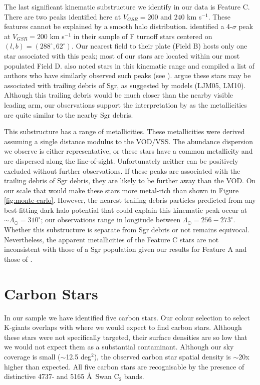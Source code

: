 	The last significant kinematic substructure we identify in our data is Feature C. There are two peaks identified here at $V_{GSR} = 200$ and $240$ km s$^{-1}$. These features cannot be explained by a smooth halo distribution. \citet{Newberg;et-al_2007} identified a 4-$\sigma$ peak at $V_{GSR} = 200$ km s$^{-1}$ in their sample of F turnoff stars centered on $(l, b) = (288^\circ, 62^\circ)$. Our nearest field to their plate (Field B) hosts only one star associated with this peak; most of our stars are located within our most populated Field D. \citet{Prior;et-al_2009b} also noted stars in this kinematic range and compiled a list of authors who have similarly observed such peaks (see \citet{Sirko;et-al_2004, Duffau;et-al_2006, Starkenburg;et-al_2009}). \citet{Prior;et-al_2009b} argue these stars may be associated with trailing debris of Sgr, as suggested by models (LJM05, LM10).  Although this trailing debris would be much closer than the nearby visible leading arm, our observations support the interpretation by \citet{Prior;et-al_2009b} as the metallicities are quite similar to the nearby Sgr debris.
	
	This substructure has a range of metallicities. These metallicities were derived assuming a single distance modulus to the VOD/VSS. The abundance dispersion we observe is either representative, or these stars have a common metallicity and are dispersed along the line-of-sight. Unfortunately neither can be positively excluded without further observations. If these peaks are associated with the trailing debris of Sgr debris, they are likely to be further away than the VOD. On our scale that would make these stars more metal-rich than shown in Figure \ref{fig:monte-carlo}. However, the nearest trailing debris particles predicted from any best-fitting dark halo potential that could explain this kinematic peak occur at $\sim\Lambda_\odot = 310^\circ$; our observations range in longitude  between $\Lambda_\odot = 256-273^\circ$. Whether this substructure is separate from Sgr debris or not remains equivocal. Nevertheless, the apparent metallicities of the Feature C stars are not inconsistent with those of a Sgr population given our results for Feature A and those of \citet{Keller;Yong;Da_Costa_2010}.
	
\section{Carbon Stars}
\label{sec:ch1-carbon-stars}	

	In our sample we have identified five carbon stars. Our colour selection to select K-giants overlaps with where we would expect to find carbon stars. Although these stars were not specifically targeted, their surface densities are so low \citep[$\approx$ 1 per 50 deg$^2$;][]{Green;et-al_1994} that we would not expect them as a substantial contaminant.  Although our sky coverage is small ($\sim$12.5 deg$^2$), the observed carbon star spatial density is $\sim20$x higher than expected. All five carbon stars are recognisable by the presence of distinctive 4737- and 5165 \AA\, Swan C$_2$ bands.


